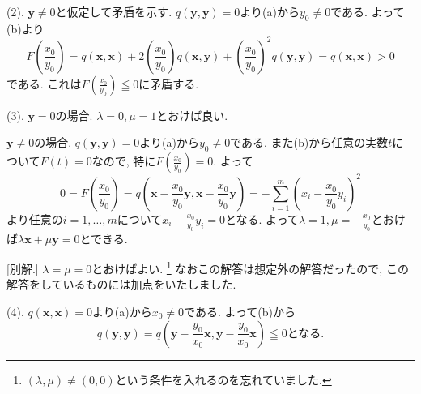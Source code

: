 \documentclass[dvipdfmx,a4paper,11pt]{article}
\theoremstyle{definition}
\begin{document}
(2). $\bm{y}\neq 0$と仮定して矛盾を示す.
$q(\bm{y},\bm{y}) =0$より(a)から$y_0 \neq 0$である.
 よって(b)より 
$$
F\left(\frac{x_0}{y_0}\right) 
= 
q(\bm{x},\bm{x})+2\left(\frac{x_0}{y_0}\right)q(\bm{x},\bm{y}) + \left(\frac{x_0}{y_0}\right)^2 q(\bm{y},\bm{y})
=
q(\bm{x},\bm{x}) >0
$$
である.
これは$F\left(\frac{x_0}{y_0}\right)\leqq 0$に矛盾する.


(3).
$\bm{y}=0$の場合. $\lambda=0, \mu=1$とおけば良い. 

$\bm{y} \neq 0$の場合. $q(\bm{y},\bm{y}) =0$より(a)から$y_0 \neq 0$である.
また(b)から任意の実数$t$について$F(t)=0$なので, 
特に$F\left(\frac{x_0}{y_0}\right) =0$. よって
$$
0=F\left(\frac{x_0}{y_0}\right) = q\left(\bm{x} - \frac{x_0}{y_0}\bm{y} ,  \bm{x} - \frac{x_0}{y_0}\bm{y} \right) 
= - \sum_{i=1}^{m}\left(x_i - \frac{x_0}{y_0} y_i \right)^2
$$
より任意の$i = 1, \ldots, m$について$x_i - \frac{x_0}{y_0}y_i =0$となる.
よって$\lambda=1, \mu= - \frac{x_0}{y_0}$とおけば$\lambda \bm{x} + \mu \bm{y}=0$とできる.

[別解.] $\lambda=\mu=0$とおけばよい. \footnote{$(\lambda, \mu) \neq (0,0)$という条件を入れるのを忘れていました.}
なおこの解答は想定外の解答だったので, この解答をしているものには加点をいたしました.


(4).
$q(\bm{x},\bm{x}) =0$より(a)から$x_0 \neq 0$である. よって(b)から
$$
q(\bm{y},\bm{y}) =q\left(\bm{y} - \frac{y_0}{x_0}\bm{x},\bm{y} - \frac{y_0}{x_0}\bm{x}\right) \leqq0
\text{となる.}
$$
\end{document}
